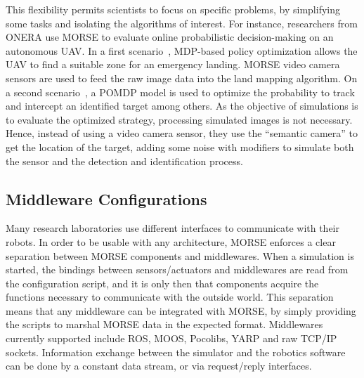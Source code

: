 \documentclass{llncs}
\newcommand{\serge}[1]{\nb{Serge}{blue}{#1}}
\newcommand{\gilberto}[1]{\nb{Gilberto}{red}{#1}}
\begin{document}
This flexibility permits scientists to focus on specific problems, by 
simplifying some tasks and isolating the algorithms of interest.
For instance, researchers from ONERA use MORSE to evaluate online probabilistic
decision-making on an autonomous UAV. In a first scenario~\cite{teichteil2011},
MDP-based policy optimization allows the UAV to find a suitable zone for an
emergency landing. MORSE video camera sensors are used to feed the raw image data
into the land mapping algorithm.
On a second scenario~\cite{carvalho2012}, a POMDP model is used to optimize the
probability to track and intercept an identified target among others. As the
objective of simulations is to evaluate the optimized strategy, processing
simulated images is not necessary. Hence, instead of using a video camera
sensor, they use the ``semantic camera'' to get the location of the target,
adding some noise with modifiers to simulate both the sensor and the detection
and identification process.
\serge{Too much and here ...}

%

\subsection{Middleware Configurations}
\label{section:middlewares}

Many research laboratories use different interfaces to communicate with their
robots. In order to be usable with any architecture, MORSE enforces a
clear separation between MORSE components and middlewares. When a simulation is started,
the bindings between sensors/actuators and middlewares are read from the
configuration script, and it is only then that components acquire the functions
necessary to communicate with the outside world.
This separation means that any middleware can be integrated with MORSE, by
simply providing the scripts to marshal MORSE data in the expected format.
Middlewares currently supported include ROS, MOOS, Pocolibs, YARP and
raw TCP/IP sockets.
Information exchange between the simulator and the robotics software can be
done by a constant data stream, or via request/reply interfaces.
\end{document}
